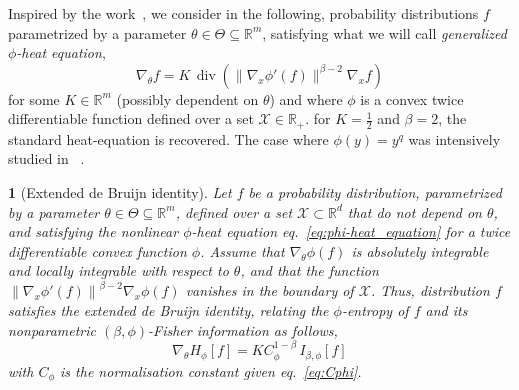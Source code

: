 \documentclass[english,sort&compress]{elsarticle}
\theoremstyle{definition}
\theoremstyle{plain}
\newtheorem{prop}{\protect\propositionname}
\theoremstyle{plain}
\providecommand{\propositionname}{Proposition}
\def\Rset{\mathbb{R}}
\def\X{\mathcal{X}}
\def\div{\operatorname{div}}
\begin{document}
Inspired by  the work~\cite{JohVig07, Ber13:08},  we consider in  the following,
probability  distributions $f$ parametrized  by a  parameter $\theta  \in \Theta
\subseteq \Rset^m$,  satisfying what we  will call {\em  generalized $\phi$-heat
  equation},
%
\begin{equation}
\label{eq:phi-heat_equation}
\nabla_\theta f = K \, \div\left( \| \nabla_x \phi'(f) \|^{\beta-2}
\nabla_x f \right)
\end{equation}
%
for some $K \in \Rset^m$ (possibly  dependent on $\theta$) and where $\phi$ is a
convex  twice differentiable  function  defined  over a  set  $\X \in  \Rset_+$.
  for $K = \frac12$  and $\beta =
2$, the standard heat-equation is recovered.  The case where $\phi(y) = y^q$ was
intensively studied  in~\cite{Ber13:08} .  

\begin{prop}[Extended de Bruijn identity]\label{prop:phiDeBruijn}
  Let $f$ be a probability distribution, parametrized by a parameter $\theta \in
  \Theta \subseteq \Rset^m$, defined over a set $\X \subset \Rset^d$ that do not
  depend  on  $\theta$,  and   satisfying  the  nonlinear  $\phi$-heat  equation
  eq.~\eqref{eq:phi-heat_equation}  for a  twice differentiable  convex function
  $\phi$.   Assume that  $\nabla_\theta  \phi(f)$ is  absolutely integrable  and
  locally integrable  with respect to  $\theta$, and that the  function $\left\|
    \nabla_x  \phi'(f)  \right\|^{\beta-2}  \nabla_x  \phi(f)$ vanishes  in  the
  boundary of  $\X$.  Thus,  distribution $f$ satisfies  the extended  de Bruijn
  identity,   relating  the   $\phi$-entropy  of   $f$  and   its  nonparametric
  $(\beta,\phi)$-Fisher information as follows,
%
\begin{equation}
\label{eq:phiDeBruijn}
\nabla_\theta H_\phi[f] = K C_\phi^{1-\beta} \, I_{\beta,\phi}[f]
\end{equation}
%
with $C_\phi$ is the normalisation constant given eq.~\eqref{eq:Cphi}. 
\end{prop}
\end{document}
